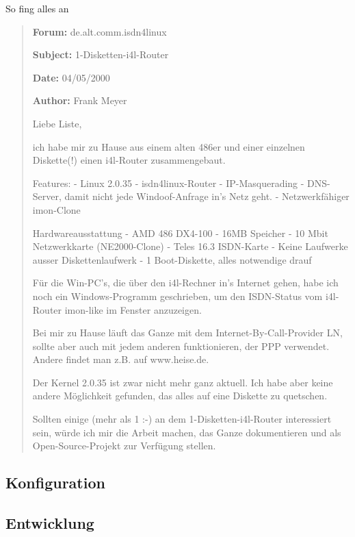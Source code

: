 \documentclass[t]{beamer}
\makeatletter
\newcommand{\strong}[1]{\@strong{#1}}
\newcommand{\@@strong}[1]{\textbf{\let\@strong\@@@strong#1}}
\newcommand{\@@@strong}[1]{\textnormal{\let\@strong\@@strong#1}}
\let\@strong\@@strong
\makeatother
\begin{document}
\begin{frame}{So fing alles an}
    \blockquote{\footnotesize%
\strong{Forum:} de.alt.comm.isdn4linux

\strong{Subject:} 1-Disketten-i4l-Router

\strong{Date:} 04/05/2000

\strong{Author:} Frank Meyer
\scriptsize

Liebe Liste,

ich habe mir zu Hause aus einem alten 486er und einer einzelnen Diskette(!)
einen i4l-Router zusammengebaut.

Features:
- Linux 2.0.35
- isdn4linux-Router
- IP-Masquerading
- DNS-Server, damit nicht jede Windoof-Anfrage in's Netz geht.
- Netzwerkfähiger imon-Clone

Hardwareausstattung
- AMD 486 DX4-100
- 16MB Speicher
- 10 Mbit Netzwerkkarte (NE2000-Clone)
- Teles 16.3 ISDN-Karte
- Keine Laufwerke ausser Diskettenlaufwerk
- 1 Boot-Diskette, alles notwendige drauf

Für die Win-PC's, die über den i4l-Rechner in's Internet gehen, habe
ich noch ein Windows-Programm geschrieben, um den ISDN-Status vom
i4l-Router imon-like im Fenster anzuzeigen.

Bei mir zu Hause läuft das Ganze mit dem Internet-By-Call-Provider LN,
sollte aber auch mit jedem anderen funktionieren, der PPP verwendet.
Andere findet man z.B. auf www.heise.de.

Der Kernel 2.0.35 ist zwar nicht mehr ganz aktuell. Ich habe aber keine
andere Möglichkeit gefunden, das alles auf eine Diskette zu quetschen.

Sollten einige (mehr als 1 :-) an dem 1-Disketten-i4l-Router
interessiert sein, würde ich mir die Arbeit machen, das Ganze
dokumentieren und als Open-Source-Projekt zur Verfügung stellen.
    }
\end{frame}

\subsection{Konfiguration}

\subsection{Entwicklung}
\end{document}
